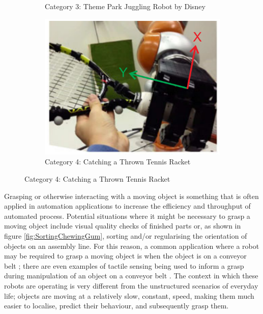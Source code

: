 \begin{figure}
\begin{subfigure}{.4\linewidth}
        \caption[Category 3: Theme Park Juggling Robot by Disney]{Category 3: Theme Park Juggling Robot by Disney \cite{DisneyRobot}}
        \label{fig:DisneyBot}
    \end{subfigure}
    \begin{subfigure}{.5\linewidth}
        \centering
    \includegraphics[width=.8\textwidth]{Images/CatchingObjectInFlight.png}
        \caption[Category 4: Catching a Thrown Tennis Racket]{Category 4: Catching a Thrown Tennis Racket \cite{DisneyRobot}}
        \label{fig:TennisRacket}
    \end{subfigure}
\end{figure}

Grasping or otherwise interacting with a moving object is something that is often applied in automation applications to increase the efficiency and throughput of automated process. Potential situations where it might be necessary to grasp a moving object include visual quality checks of finished parts or, as shown in figure \ref{fig:SortingChewingGum}, sorting and/or regularising the orientation of objects on an assembly line. For this reason, a common application where a robot may be required to grasp a moving object is when the object is on a conveyor belt \cite{ConveyorBeltTracking, FingertipEmitterReceiverMovingObjectII,FingertipEmitterReceiverMovingObject}; there are even examples of tactile sensing being used to inform a grasp during manipulation of an object on a conveyor belt \cite{ConveyorUnknownObject}. The context in which these robots are operating is very different from the unstructured scenarios of everyday life; objects are moving at a relatively slow, constant, speed, making them much easier to localise, predict their behaviour, and subsequently grasp them.

